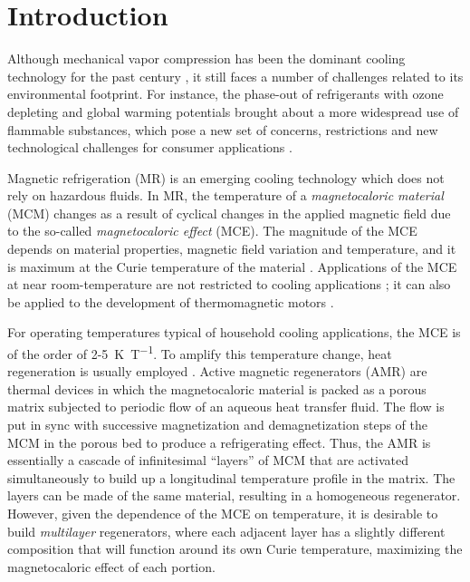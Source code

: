 \documentclass[referee]{svjour3}
\begin{document}
\printnomenclature

\section{Introduction}
\label{sec:introduction}

Although mechanical vapor compression has been the dominant cooling technology for the past century \cite{bib:nik}, it still faces a number of challenges related to its environmental footprint. For instance, the phase-out of refrigerants with ozone depleting and global warming potentials brought about a more widespread use of flammable substances, which pose a new set of concerns, restrictions and new technological challenges for consumer applications \cite{bib:iir-flammable, bib:lionte18-adapt}.

Magnetic refrigeration (MR) is an emerging cooling technology which does not rely on hazardous fluids. In MR, the temperature of a  \emph{magnetocaloric material} (MCM) changes as a result of cyclical changes in the applied magnetic field due to the so-called \emph{magnetocaloric effect} (MCE). The magnitude of the MCE depends on  material properties, magnetic field variation and temperature, and it is maximum at the Curie temperature of the material \cite{bib:smith-magneto, bib:kitanovski}. Applications of the MCE at near room-temperature are not restricted to cooling applications \cite{bib:gimaev19-review-htsc,bib:greco19}; it can also be applied to the development of thermomagnetic motors \cite{bib:kaneko19-desig}.   



For operating temperatures typical of household cooling applications, the MCE is of the order of \num{2}-\SI{5}{\kelvin\per\tesla}. To amplify this temperature change, heat regeneration is usually employed \cite{bib:kitanovski}. Active magnetic regenerators (AMR) are thermal devices in which the magnetocaloric material is packed as a porous matrix subjected to periodic flow of an aqueous heat transfer fluid. The flow is put in sync with successive magnetization and demagnetization steps of the MCM in the porous bed to produce a refrigerating effect. Thus, the AMR is essentially a cascade of infinitesimal ``layers'' of MCM that are activated simultaneously to build up a longitudinal temperature profile in the matrix. The layers can be made of the same material, resulting in a homogeneous regenerator. However, given the dependence of the MCE on temperature, it is desirable to build \emph{multilayer} regenerators, where each adjacent layer has a slightly different composition that will function around its own Curie temperature, maximizing the magnetocaloric effect of each portion.
\end{document}
